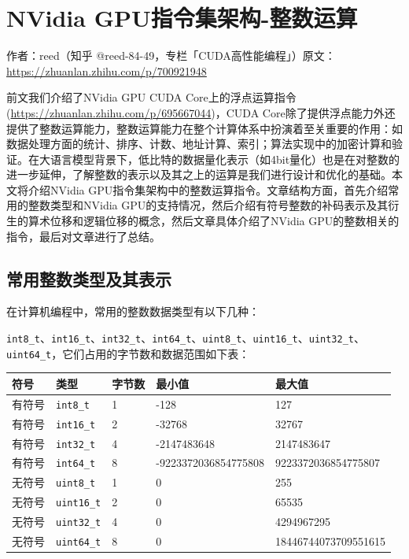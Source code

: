 \chapter{NVidia GPU指令集架构-整数运算}

\begin{center}\small 作者：reed（知乎 @reed-84-49，专栏「CUDA高性能编程」）\quad 原文：\url{https://zhuanlan.zhihu.com/p/700921948}\end{center}

前文我们介绍了NVidia GPU CUDA Core上的浮点运算指令(\url{https://zhuanlan.zhihu.com/p/695667044})，CUDA Core除了提供浮点能力外还提供了整数运算能力，整数运算能力在整个计算体系中扮演着至关重要的作用：如数据处理方面的统计、排序、计数、地址计算、索引；算法实现中的加密计算和验证。在大语言模型背景下，低比特的数据量化表示（如4bit量化）也是在对整数的进一步延伸，了解整数的表示以及其之上的运算是我们进行设计和优化的基础。本文将介绍NVidia GPU指令集架构中的整数运算指令。文章结构方面，首先介绍常用的整数类型和NVidia GPU的支持情况，然后介绍有符号整数的补码表示及其衍生的算术位移和逻辑位移的概念，然后文章具体介绍了NVidia GPU的整数相关的指令，最后对文章进行了总结。

\section{常用整数类型及其表示}

在计算机编程中，常用的整数数据类型有以下几种：

\lstinline|int8_t|、\lstinline|int16_t|、\lstinline|int32_t|、\lstinline|int64_t|、\lstinline|uint8_t|、\lstinline|uint16_t|、\lstinline|uint32_t|、\lstinline|uint64_t|，它们占用的字节数和数据范围如下表：

\begin{table}[htbp]\centering
\begin{tabular}{lllll}
\toprule
符号 & 类型 & 字节数 & 最小值 & 最大值 \\
\midrule
有符号 & \texttt{int8\_t} & 1 & -128 & 127 \\
有符号 & \texttt{int16\_t} & 2 & -32768 & 32767 \\
有符号 & \texttt{int32\_t} & 4 & -2147483648 & 2147483647 \\
有符号 & \texttt{int64\_t} & 8 & -9223372036854775808 & 9223372036854775807 \\
无符号 & \texttt{uint8\_t} & 1 & 0 & 255 \\
无符号 & \texttt{uint16\_t} & 2 & 0 & 65535 \\
无符号 & \texttt{uint32\_t} & 4 & 0 & 4294967295 \\
无符号 & \texttt{uint64\_t} & 8 & 0 & 18446744073709551615 \\
\bottomrule
\end{tabular}
\end{table}

